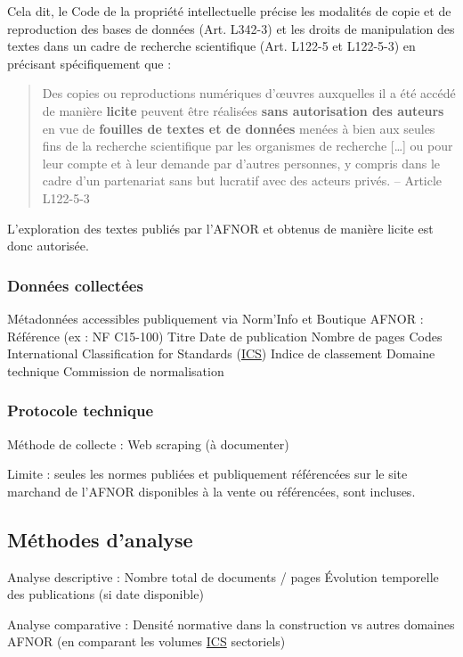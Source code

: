 \documentclass[a4paper,12pt]{article}
\begin{document}
Cela dit, le Code de la propriété intellectuelle précise les modalités de copie et de reproduction des bases de données (Art. L342-3) et les droits de manipulation des textes dans un cadre de recherche scientifique (Art. L122-5 et L122-5-3)\autocite{CodeProprieteIntellectuelle} en précisant spécifiquement que :
\begin{quote}
Des copies ou reproductions numériques d'œuvres auxquelles il a été accédé de manière \textbf{licite} peuvent être réalisées \textbf{sans autorisation des auteurs} en vue de \textbf{fouilles de textes et de données} menées à bien aux seules fins de la recherche scientifique par les organismes de recherche [\ldots{}] ou pour leur compte et à leur demande par d'autres personnes, y compris dans le cadre d'un partenariat sans but lucratif avec des acteurs privés. -- Article L122-5-3\autocite{CodeProprieteIntellectuelle}
\end{quote}

L'exploration des textes publiés par l'AFNOR et obtenus de manière licite est donc autorisée.
\subsubsection{Données collectées}
\label{sec:org20bee2c}
Métadonnées accessibles publiquement via Norm’Info et Boutique AFNOR :
    Référence (ex : NF C15-100)
    Titre
    Date de publication
    Nombre de pages
    Codes International Classification for Standards
 (\protect\hyperlink{gls-21}{\label{gls-21-use-1}ICS})
    Indice de classement
    Domaine technique
    Commission de normalisation
\subsubsection{Protocole technique}
\label{sec:org188080b}
Méthode de collecte : Web scraping (à documenter)

Limite : seules les normes publiées et publiquement référencées sur le site marchand de l'AFNOR disponibles à la vente ou référencées, sont incluses.
\subsection{Méthodes d'analyse}
\label{sec:orgb1ec7ba}
Analyse descriptive :
    Nombre total de documents / pages
    Évolution temporelle des publications (si date disponible)

Analyse comparative :
    Densité normative dans la construction vs autres domaines AFNOR (en comparant les volumes \protect\hyperlink{gls-21}{\label{gls-21-use-2}ICS} sectoriels)
\end{document}
